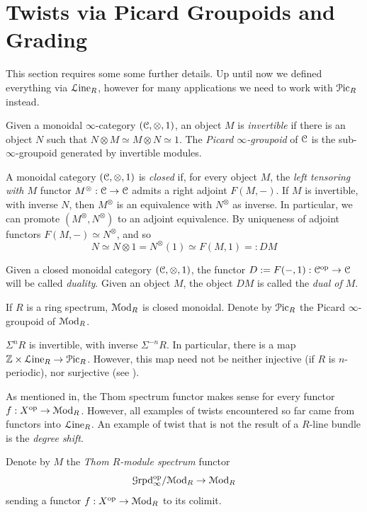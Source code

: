\documentclass[10pt]{amsart}
\begin{document}
\section{Twists via Picard Groupoids and Grading}
This section requires some some further details. Up until now we defined everything via $\mathcal{L}\mathrm{ine}_R$, however for many applications we need to work with $\mathcal{P}\mathrm{ic}_R$ instead.
\begin{definition}
	Given a monoidal $\infty$-category $(\mathcal{C},\otimes,1)$, an object $M$ is \emph{invertible} if there is an object $N$ such that $N\otimes M\simeq M\otimes N\simeq 1$. The \emph{Picard $\infty$-groupoid} of $\mathcal{C}$ is the sub-$\infty$-groupoid generated by invertible modules. 
\end{definition}
\begin{remark}\label{rmk:dualinver}
	A monoidal category $(\mathcal{C},\otimes,1)$ is \emph{closed} if, for every object $M$, the \emph{left tensoring with $M$} functor $M^\otimes:\mathcal{C}\to\mathcal{C}$ admits a right adjoint $F(M,-)$. If $M$ is invertible, with inverse $N$, then $M^\otimes$ is an equivalence with $N^\otimes$ as inverse. In particular, we can promote $(M^\otimes,N^\otimes)$ to an adjoint equivalence. By uniqueness of adjoint functors $F(M,-)\simeq N^\otimes$, and so \[N\simeq N\otimes1= N^\otimes(1)\simeq F(M,1)=:DM\] 
\end{remark}
\begin{definition}
	Given a closed monoidal category $(\mathcal{C},\otimes,1)$, the functor $D:=F(-,1):\mathcal{C}^{\mathrm{op}}\to\mathcal{C}$ will be called \emph{duality}. Given an object $M$, the object $DM$ is called the \emph{dual of $M$}. 
\end{definition}
\begin{definition}
If $R$ is a ring spectrum, $\mathcal{M}\mathrm{od}_R$ is closed monoidal. Denote by $\mathcal{P}\mathrm{ic}_R$ the Picard $\infty$-groupoid of $\mathcal{M}\mathrm{od}_R$. 
\end{definition}
\begin{remark}
	$\Sigma^nR$ is invertible, with inverse $\Sigma^{-n}R$. In particular, there is a map $\mathbb{Z}\times\mathcal{L}\mathrm{ine}_R\to\mathcal{P}\mathrm{ic}_R$. However, this map need not be neither injective (if $R$ is $n$-periodic), nor surjective (see \cite{hill2011tmf}). 
\end{remark}
As mentioned in, the Thom spectrum functor makes sense for every functor $f:X^{\mathrm{op}}\to\mathcal{M}\mathrm{od}_R$. However, all examples of twists encountered so far came from functors into $\mathcal{L}\mathrm{ine}_R$. An example of twist that is not the result of a $R$-line bundle is the \emph{degree shift}. 
\begin{definition}
	Denote by $M$ the \emph{Thom $R$-module spectrum} functor \[\mathcal{G}\mathrm{rpd}^{\mathrm{op}}_\infty/\mathcal{M}\mathrm{od}_R\to\mathcal{M}\mathrm{od}_R\]sending a functor $f:X^{\mathrm{op}}\to\mathcal{M}\mathrm{od}_R$ to its colimit.  
\end{definition}
\end{document}
